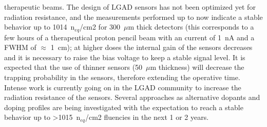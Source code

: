 therapeutic beams. The design of LGAD sensors has not been optimized yet for radiation
resistance, and the measurements performed up to now indicate a stable behavior up to 1014~n$_{eq}$/cm2 for 300~$\mu$m thick detectors (this corresponds to a few hours of a therapeutical proton
pencil beam with an current of 1~nA and a FWHM of $\approx$ 1~cm); at higher doses the internal gain
of the sensors decreases and it is necessary to raise the bias voltage to keep a stable signal level.
It is expected that the use of thinner sensors (50~$\mu$m thickness) will decrease the trapping
probability in the sensors, therefore extending the operative time. Intense work is currently going
on in the LGAD community to increase the radiation resistance of the sensors. Several
approaches as alternative dopants and doping profiles are being investigated with the expectation
to reach a stable behavior up to >1015~n$_{eq}$/cm2 fluencies in the next 1 or 2 years.


